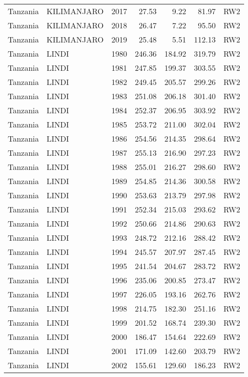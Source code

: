 \begin{longtable}{lllrrrl}
  Tanzania & KILIMANJARO & 2017 & 27.53 & 9.22 & 81.97 & RW2 \\ 
  Tanzania & KILIMANJARO & 2018 & 26.47 & 7.22 & 95.50 & RW2 \\ 
  Tanzania & KILIMANJARO & 2019 & 25.48 & 5.51 & 112.13 & RW2 \\ 
  Tanzania & LINDI & 1980 & 246.36 & 184.92 & 319.79 & RW2 \\ 
  Tanzania & LINDI & 1981 & 247.85 & 199.37 & 303.55 & RW2 \\ 
  Tanzania & LINDI & 1982 & 249.45 & 205.57 & 299.26 & RW2 \\ 
  Tanzania & LINDI & 1983 & 251.08 & 206.18 & 301.40 & RW2 \\ 
  Tanzania & LINDI & 1984 & 252.37 & 206.95 & 303.92 & RW2 \\ 
  Tanzania & LINDI & 1985 & 253.72 & 211.00 & 302.04 & RW2 \\ 
  Tanzania & LINDI & 1986 & 254.56 & 214.35 & 298.64 & RW2 \\ 
  Tanzania & LINDI & 1987 & 255.13 & 216.90 & 297.23 & RW2 \\ 
  Tanzania & LINDI & 1988 & 255.01 & 216.27 & 298.60 & RW2 \\ 
  Tanzania & LINDI & 1989 & 254.85 & 214.36 & 300.58 & RW2 \\ 
  Tanzania & LINDI & 1990 & 253.63 & 213.79 & 297.98 & RW2 \\ 
  Tanzania & LINDI & 1991 & 252.34 & 215.03 & 293.62 & RW2 \\ 
  Tanzania & LINDI & 1992 & 250.66 & 214.86 & 290.63 & RW2 \\ 
  Tanzania & LINDI & 1993 & 248.72 & 212.16 & 288.42 & RW2 \\ 
  Tanzania & LINDI & 1994 & 245.57 & 207.97 & 287.45 & RW2 \\ 
  Tanzania & LINDI & 1995 & 241.54 & 204.67 & 283.72 & RW2 \\ 
  Tanzania & LINDI & 1996 & 235.06 & 200.85 & 273.47 & RW2 \\ 
  Tanzania & LINDI & 1997 & 226.05 & 193.16 & 262.76 & RW2 \\ 
  Tanzania & LINDI & 1998 & 214.75 & 182.30 & 251.16 & RW2 \\ 
  Tanzania & LINDI & 1999 & 201.52 & 168.74 & 239.30 & RW2 \\ 
  Tanzania & LINDI & 2000 & 186.47 & 154.64 & 222.69 & RW2 \\ 
  Tanzania & LINDI & 2001 & 171.09 & 142.60 & 203.79 & RW2 \\ 
  Tanzania & LINDI & 2002 & 155.61 & 129.60 & 186.23 & RW2 \\ 

\end{longtable}
